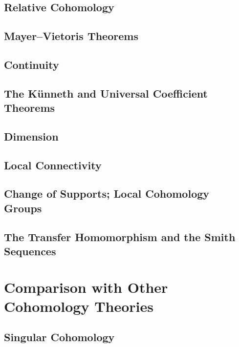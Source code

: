 \documentclass[11pt, a4paper]{article}
\begin{document}
\subsection{Relative Cohomology}

\subsection{Mayer--Vietoris Theorems}

\subsection{Continuity}

\subsection{The K\"unneth and Universal Coefficient Theorems}

\subsection{Dimension}

\subsection{Local Connectivity}

\subsection{Change of Supports; Local Cohomology Groups}

\subsection{The Transfer Homomorphism and the Smith Sequences}

\section{Comparison with Other Cohomology Theories}

\subsection{Singular Cohomology}
\end{document}
